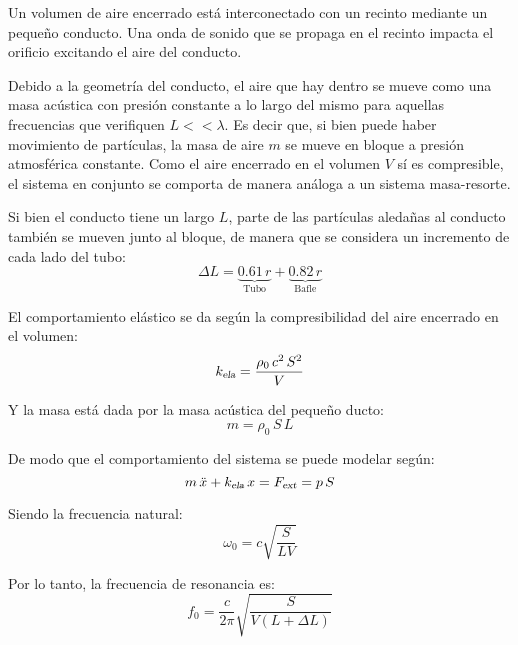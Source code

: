 \documentclass[a5paper,12pt,twoside]{book}
\begin{document}
Un volumen de aire encerrado está interconectado con un recinto mediante un pequeño conducto.
Una onda de sonido que se propaga en el recinto impacta el orificio excitando el aire del conducto.

\begin{center}
    \def\svgwidth{0.8\linewidth}
    
\end{center}

Debido a la geometría del conducto, el aire que hay dentro se mueve como una masa acústica con presión constante a lo largo del mismo para aquellas frecuencias que verifiquen $L<<\lambda$.
Es decir que, si bien puede haber movimiento de partículas, la masa de aire $m$ se mueve en bloque a presión atmosférica constante.
Como el aire encerrado en el volumen $V$ sí es compresible, el sistema en conjunto se comporta de manera análoga a un sistema masa-resorte.

Si bien el conducto tiene un largo $L$, parte de las partículas aledañas al conducto también se mueven junto al bloque, de manera que se considera un incremento de cada lado del tubo:
\begin{equation*}
    \Delta L = \underbrace{0.61 \, r}_{\text{Tubo}} + \underbrace{0.82 \, r}_{\text{Bafle}}
\end{equation*}

El comportamiento elástico se da según la compresibilidad del aire encerrado en el volumen:
\begin{equation*}
    {{k}_\textsl{{ela}}} = \frac{\rho_0 \, c^2 \, S^2}{V}
\end{equation*}

Y la masa está dada por la masa acústica del pequeño ducto:
\begin{equation*}
    m = \rho_0 \, S \, L
\end{equation*}

De modo que el comportamiento del sistema se puede modelar según:
\begin{equation*}
    m \, \ddot{x} + {{k}_\textsl{{ela}}} \, x = {{F}_\textsl{{ext}}} = p \, S
\end{equation*}

Siendo la frecuencia natural:
\begin{equation*}
    \omega_0 = c \sqrt{\frac{S}{LV}}
\end{equation*}

Por lo tanto, la frecuencia de resonancia es:
\begin{equation*}
    f_0 = \frac{c}{2\pi} \sqrt{\frac{S}{V \left( L+ \Delta L \right)}}
\end{equation*}
\end{document}

